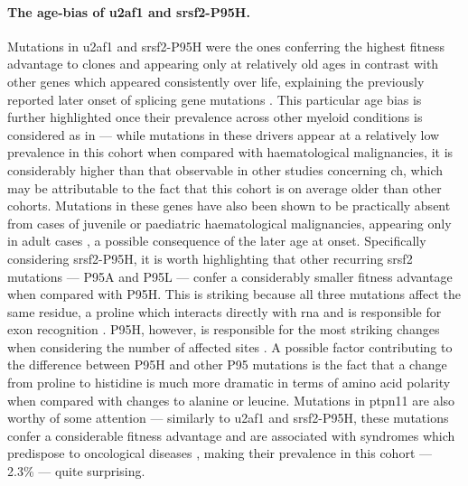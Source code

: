 \paragraph{The age-bias of \ac{u2af1} and \ac{srsf2}-P95H.} Mutations in \ac{u2af1} and \ac{srsf2}-P95H were the ones conferring the highest fitness advantage to clones and appearing only at relatively old ages in contrast with other genes which appeared consistently over life, explaining the previously reported later onset of splicing gene mutations \cite{McKerrell2015-rl}. This particular age bias is further highlighted once their prevalence across other myeloid conditions is considered as in  --- while mutations in these drivers appear at a relatively low prevalence in this cohort when compared with haematological malignancies, it is considerably higher than that observable in other studies concerning \ac{ch}, which may be attributable to the fact that this cohort is on average older than other cohorts. Mutations in these genes have also been shown to be practically absent from cases of juvenile or paediatric haematological malignancies, appearing only in adult cases \cite{Kar2013-nw,Takita2012-yo}, a possible consequence of the later age at onset. Specifically considering \ac{srsf2}-P95H, it is worth highlighting that other recurring \ac{srsf2} mutations --- P95A and P95L --- confer a considerably smaller fitness advantage when compared with P95H. This is striking because all three mutations affect the same residue, a proline which interacts directly with \ac{rna} and is responsible for exon recognition \cite{Daubner2012-zp,Kim2015-qz}. P95H, however, is responsible for the most striking changes when considering the number of affected sites \cite{Rahman2020-bh,Zhang2015-xu}. A possible factor contributing to the difference between P95H and other P95 mutations is the fact that a change from proline to histidine is much more dramatic in terms of amino acid polarity when compared with changes to alanine or leucine. Mutations in \ac{ptpn11} are also worthy of some attention --- similarly to \ac{u2af1} and \ac{srsf2}-P95H, these mutations confer a considerable fitness advantage and are associated with syndromes which predispose to oncological diseases \cite{Digilio2002-nq,Tartaglia2001-ru,Kratz2005-qh}, making their prevalence in this cohort --- 2.3\% --- quite surprising.

